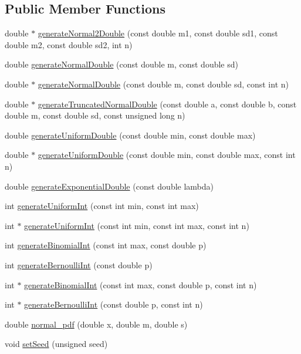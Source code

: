 \subsection*{Public Member Functions}
\begin{DoxyCompactItemize}
\item 
double $\ast$ \hyperlink{class_random_number_generator_a6a8cdbfdb3343a10aab18b83fc6ce0dc}{generate\+Normal2\+Double} (const double m1, const double sd1, const double m2, const double sd2, int n)
\item 
double \hyperlink{class_random_number_generator_a2598d9959bf595c3703c1d8e24f6e2f1}{generate\+Normal\+Double} (const double m, const double sd)
\item 
double $\ast$ \hyperlink{class_random_number_generator_a8a08591104b4fd1943eade351aa126c9}{generate\+Normal\+Double} (const double m, const double sd, const int n)
\item 
double $\ast$ \hyperlink{class_random_number_generator_a4e0cc6be3677ba52821cd4e0ae92cca9}{generate\+Truncated\+Normal\+Double} (const double a, const double b, const double m, const double sd, const unsigned long n)
\item 
double \hyperlink{class_random_number_generator_a0cbfb491d75d113c5bd0816576cb56ed}{generate\+Uniform\+Double} (const double min, const double max)
\item 
double $\ast$ \hyperlink{class_random_number_generator_a208c3dcccf6aa6a62151a98d58264d08}{generate\+Uniform\+Double} (const double min, const double max, const int n)
\item 
double \hyperlink{class_random_number_generator_a95d897f9265ece8d5ee18fbf2802b844}{generate\+Exponential\+Double} (const double lambda)
\item 
int \hyperlink{class_random_number_generator_aa2dd0dd9e4b520517cd31466c7066a0a}{generate\+Uniform\+Int} (const int min, const int max)
\item 
int $\ast$ \hyperlink{class_random_number_generator_a5a3645c649783d3208319a016f744c5f}{generate\+Uniform\+Int} (const int min, const int max, const int n)
\item 
int \hyperlink{class_random_number_generator_a417f97fb1a4362621b60107d98c3b4e7}{generate\+Binomial\+Int} (const int max, const double p)
\item 
int \hyperlink{class_random_number_generator_a480c13d951cbcc9dd3a3afa29145c097}{generate\+Bernoulli\+Int} (const double p)
\item 
int $\ast$ \hyperlink{class_random_number_generator_a5b95ab4b064f39c8bdbb14af938efc0e}{generate\+Binomial\+Int} (const int max, const double p, const int n)
\item 
int $\ast$ \hyperlink{class_random_number_generator_a2b52648a0de3e6da4c51a0f9b30a67f0}{generate\+Bernoulli\+Int} (const double p, const int n)
\item 
double \hyperlink{class_random_number_generator_a4e661a49e8dd66e13c313c99adefddb0}{normal\+\_\+pdf} (double x, double m, double s)
\item 
void \hyperlink{class_random_number_generator_a20e812772b0544720b32256911e372e2}{set\+Seed} (unsigned seed)
\end{DoxyCompactItemize}
